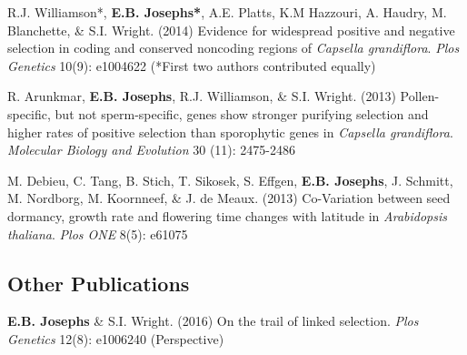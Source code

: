 \documentclass[letterpaper]{article}
\begin{document}
\begin{etaremune}
  \item R.J. Williamson*, \textbf{E.B. Josephs*}, A.E. Platts, K.M Hazzouri, A. Haudry, M. Blanchette, \& S.I. Wright. (2014) Evidence for widespread positive and negative selection in coding and conserved noncoding regions of \textit{Capsella grandiflora}. \textit{Plos Genetics} 10(9): e1004622 (*First two authors contributed equally)
  \item R. Arunkmar, \textbf{E.B. Josephs}, R.J. Williamson, \& S.I. Wright. (2013) Pollen-specific, but not sperm-specific, genes show stronger purifying selection and higher rates of positive selection than sporophytic genes in \textit{Capsella grandiflora}. \textit{Molecular Biology and Evolution} 30 (11): 2475-2486
  \item M. Debieu, C. Tang, B. Stich, T. Sikosek, S. Effgen, \textbf{E.B. Josephs}, J. Schmitt, M. Nordborg, M. Koornneef, \& J. de Meaux. (2013) Co-Variation between seed dormancy, growth rate and flowering time changes with latitude in \textit{Arabidopsis thaliana}.  \textit{Plos ONE} 8(5): e61075
\end{etaremune}

 
\subsection*{Other Publications}
\begin{etaremune}
 \item \textbf{E.B. Josephs} \& S.I. Wright. (2016) On the trail of linked selection. \textit{Plos Genetics} 12(8): e1006240 (Perspective)
 \end{etaremune}


\end{document}
